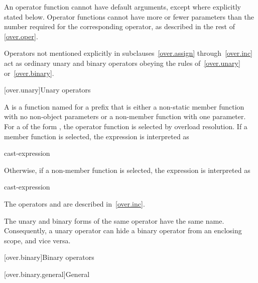 \pnum
{}%
An operator function cannot have default arguments,
except where explicitly stated below.
Operator
functions cannot have more or fewer parameters than the
number required for the corresponding operator, as
described in the rest of \ref{over.oper}.

\pnum
Operators not mentioned explicitly in subclauses~\ref{over.assign} through~\ref{over.inc}
act as ordinary unary and binary
operators obeying the rules of~\ref{over.unary} or~\ref{over.binary}.%
%

[over.unary]{Unary operators}%
%

\pnum
A 
is a function named 
for a prefix  
that is either
a non-static member function with no non-object parameters or
a non-member function with one parameter.
%
For a 
of the form ,
the operator function is selected by overload resolution.
If a member function is selected,
the expression is interpreted as
\begin{ncsimplebnf}
cast-expression    \terminal{(}\terminal{)}
\end{ncsimplebnf}
Otherwise, if a non-member function is selected,
the expression is interpreted as
\begin{ncsimplebnf}
  \terminal{(} cast-expression \terminal{)}
\end{ncsimplebnf}
\begin{note}
The operators \tcode{++} and \tcode{--}
are described in~\ref{over.inc}.
\end{note}

\pnum
\begin{note}
The unary and binary forms of the same operator have the same name.
Consequently, a unary operator can hide a binary
operator from an enclosing scope, and vice versa.
\end{note}

[over.binary]{Binary operators}%

[over.binary.general]{General}%
%

